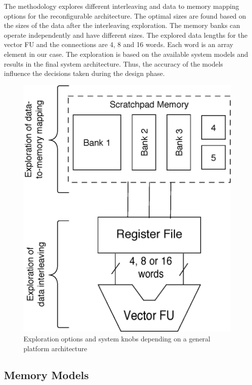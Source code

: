 \documentclass[prodmode,acmtecs]{acmsmall}
\begin{document}
The methodology explores different interleaving and data to memory mapping options for the reconfigurable architecture.
The optimal sizes are found based on the sizes of the data after the interleaving exploration.
The memory banks can operate independently and have different sizes.
The explored data lengths for the vector FU and the connections are 4, 8 and 16 words.
Each word is an array element in our case.
The exploration is based on the available system models and results in the final system architecture.
Thus, the accuracy of the models influence the decisions taken during the design phase.

\begin{figure}
\centering
	\includegraphics[scale = 0.6]{Images/Architecture.eps} 
	\caption{Exploration options and system knobs depending on a general platform architecture}
	\label{fig:arch}
\end{figure}

\subsection{Memory Models}
\end{document}
